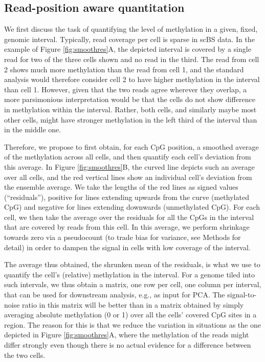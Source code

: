 \documentclass[twocolumn,10pt]{article}
\newcommand{\new}[1]{#1} %
\begin{document}
\subsection{Read-position aware quantitation} \label{residuals}

We first discuss the task of quantifying the level of methylation in a given, fixed, genomic interval.
Typically, read coverage per cell is sparse in scBS data.
In the example of Figure \ref{fig:smoothres}A, the depicted interval is covered by a single read for two of the three cells shown and no read in the third.
The read from cell 2 shows much more methylation than the read from cell 1, and the standard analysis would therefore consider cell 2 to have higher methylation in the interval than cell 1.
However, given that the two reads agree wherever they overlap, a more parsimonious interpretation would be that the cells do not show difference in methylation within the interval.
Rather, both cells, and similarly maybe most other cells, might have stronger methylation in the left third of the interval than in the middle one.

Therefore, we propose to first obtain, for each CpG position, a \new{smoothed} average of the methylation across all cells, and then quantify each cell's deviation from this average.
In Figure \ref{fig:smoothres}B, the curved line depicts such an average over all cells, and the red vertical lines show an individual cell's deviation from the ensemble average.
We take the lengths of the red lines as signed values (``residuals''), positive for lines extending upwards from the curve (methylated CpG) and negative for lines extending downwards (unmethylated CpG).
For each cell, we then take the average over the residuals for all the CpGs in the interval that are covered by reads from this cell.
In this average, we perform shrinkage towards zero via a pseudocount (to trade bias for variance, see Methods for detail) in order to dampen the signal in cells with low coverage of the interval.

The average thus obtained, the shrunken mean of the residuals, is what we use to quantify the cell's (relative) methylation in the interval.
For a genome tiled into such intervals, we thus obtain a matrix, one row per cell, one column per interval, that can be used for downstream analysis, e.g., as input for PCA.
The signal-to-noise ratio in this matrix will be better than in a matrix obtained by simply averaging absolute methylation (0 or 1) over all the cells' covered CpG sites in a region.
The reason for this is that we reduce the variation in situations as the one depicted in Figure \ref{fig:smoothres}A, where the methylation of the reads might differ strongly even though there is no actual evidence for a difference between the two cells.
\end{document}

